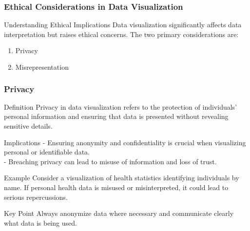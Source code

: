 \documentclass{beamer}
\begin{document}
\begin{frame}[fragile]
    \frametitle{Ethical Considerations in Data Visualization}
    \begin{block}{Understanding Ethical Implications}
        Data visualization significantly affects data interpretation but raises ethical concerns. The two primary considerations are:
    \end{block}
    \begin{enumerate}
        \item Privacy
        \item Misrepresentation
    \end{enumerate}
\end{frame}

\begin{frame}[fragile]
    \frametitle{Privacy}
    \begin{block}{Definition}
        Privacy in data visualization refers to the protection of individuals' personal information and ensuring that data is presented without revealing sensitive details.
    \end{block}
    \begin{block}{Implications}
        - Ensuring anonymity and confidentiality is crucial when visualizing personal or identifiable data. \\
        - Breaching privacy can lead to misuse of information and loss of trust.
    \end{block}
    \begin{block}{Example}
        Consider a visualization of health statistics identifying individuals by name. If personal health data is misused or misinterpreted, it could lead to serious repercussions.
    \end{block}
    \begin{block}{Key Point}
        Always anonymize data where necessary and communicate clearly what data is being used.
    \end{block}
\end{frame}
\end{document}
